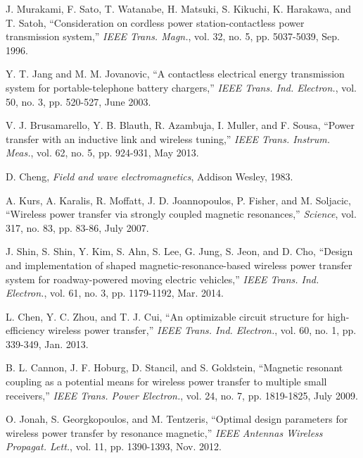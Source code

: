 \documentclass[onecolumn, a4size, 11pt]{IEEEtran}
\begin{document}
\begin{thebibliography}{27} \label{sec:refs}


 J. Murakami, F. Sato, T. Watanabe, H. Matsuki, S. Kikuchi, K. Harakawa, and T. Satoh, ``Consideration on cordless power station-contactless power transmission system,'' {\it IEEE Trans. Magn.}, vol. 32, no. 5, pp. 5037-5039, Sep. 1996.



 Y. T. Jang and M. M. Jovanovic, ``A contactless electrical energy transmission system for portable-telephone battery chargers,'' {\it IEEE Trans.
Ind. Electron.}, vol. 50, no. 3, pp. 520-527, June 2003.

 V. J. Brusamarello, Y. B. Blauth, R.  Azambuja, I. Muller,  and F.  Sousa, ``Power transfer with an inductive link and wireless tuning,'' {\it IEEE Trans. Instrum. Meas.}, vol. 62, no. 5,  pp. 924-931,  May 2013.


 D. Cheng,  \textit{Field and wave electromagnetics},  Addison Wesley, 1983.

  A. Kurs, A. Karalis, R. Moffatt, J. D. Joannopoulos, P. Fisher, and M. Soljacic, ``Wireless power transfer via strongly coupled magnetic resonances,''
{\it Science}, vol. 317, no. 83, pp. 83-86, July 2007.








 J. Shin, S. Shin, Y. Kim, S. Ahn, S. Lee, G. Jung, S. Jeon, and D. Cho, ``Design and implementation of shaped magnetic-resonance-based wireless power transfer system for roadway-powered moving electric vehicles,'' {\it IEEE Trans.
Ind. Electron.}, vol. 61, no. 3,  pp. 1179-1192,  Mar. 2014.

 L. Chen, Y. C. Zhou, and T. J. Cui, ``An optimizable circuit structure for high-efficiency wireless power transfer,'' {\it IEEE Trans. Ind. Electron.}, vol. 60, no. 1,  pp. 339-349,  Jan. 2013.



 B. L. Cannon, J. F. Hoburg, D. Stancil, and S. Goldstein, ``Magnetic resonant coupling as a potential means for wireless power transfer to multiple small receivers,'' {\it IEEE Trans. Power Electron.}, vol. 24, no. 7, pp. 1819-1825, July 2009.

 O. Jonah, S.  Georgkopoulos, and M. Tentzeris, ``Optimal design parameters for wireless power transfer by resonance magnetic,'' {\it IEEE Antennas Wireless Propagat. Lett.}, vol. 11,   pp. 1390-1393, Nov. 2012.




\end{thebibliography}
\end{document}
